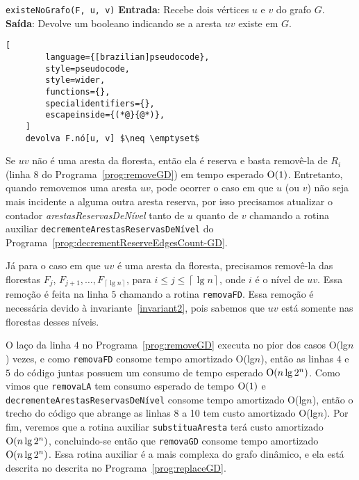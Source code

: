 \begin{programruledcaption}{\texttt{existeNoGrafo(F, u, v)} \label{prog:existGD}}
    \noindent\textbf{Entrada}: Recebe dois vértices $u$ e $v$ do grafo $G$. \\
    \textbf{Saída}: Devolve um booleano indicando se a aresta $uv$ existe em $G$.
    \vspace{-0.5\baselineskip}
    \begin{lstlisting}[
        language={[brazilian]pseudocode},
        style=pseudocode,
        style=wider,
        functions={},
        specialidentifiers={},
        escapeinside={(*@}{@*)},
    ]
    devolva F.nó[u, v] $\neq \emptyset$ 
    \end{lstlisting}
    \vspace{-0.5\baselineskip}
\end{programruledcaption}

Se $uv$ não é uma aresta da floresta, então ela é reserva e basta removê-la de $R_i$ (linha $8$ do Programa~\ref{prog:removeGD}) em tempo esperado $\mathrm{O}(1)$. Entretanto, quando removemos uma aresta $uv$, pode ocorrer o caso em que $u$ (ou $v$) não seja mais incidente a alguma outra aresta reserva, por isso precisamos atualizar o contador \textit{arestasReservasDeNível} tanto de $u$ quanto de $v$ chamando a rotina auxiliar \texttt{decrementeArestasReservasDeNível} do Programa~\ref{prog:decrementReserveEdgesCount-GD}.

Já para o caso em que $uv$ é uma aresta da floresta, precisamos removê-la das florestas $F_j$, $F_{j+1}, \ldots, F_{\left\lceil \lg n \right\rceil}$, para $i \leq j \leq \left\lceil \lg n \right\rceil$, onde $i$ é o nível de $uv$. Essa remoção é feita na linha $5$ chamando a rotina \texttt{removaFD}. Essa remoção é necessária devido à invariante~\ref{invariant2}, pois sabemos que $uv$ está somente nas florestas desses níveis. 

O laço da linha $4$ no Programa~\ref{prog:removeGD} executa no pior dos casos O(lg$n$) vezes, e como \texttt{removaFD} consome tempo amortizado O(lg$n$), então as linhas $4$ e $5$ do código juntas possuem um consumo de tempo esperado $\mathrm{O}(n \lg 2^n)$. Como vimos que \texttt{removaLA} tem consumo esperado de tempo $\mathrm{O}(1)$ e \texttt{decrementeArestasReservasDeNível} consome tempo amortizado O(lg$n$), então o trecho do código que abrange as linhas 8 a 10 tem custo amortizado O(lg$n$). Por fim, veremos que a rotina auxiliar \texttt{substituaAresta} terá custo amortizado $\mathrm{O}(n \lg 2^n)$, concluindo-se então que \texttt{removaGD} consome tempo amortizado $\mathrm{O}(n \lg 2^n)$. Essa rotina auxiliar é a mais complexa do grafo dinâmico, e ela está descrita no descrita no Programa~\ref{prog:replaceGD}.

